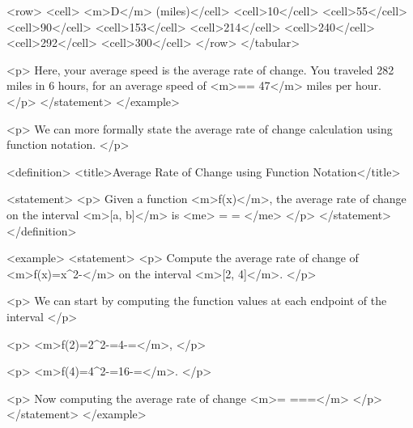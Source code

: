                    <row>
                        <cell> <m>D</m> (miles)</cell>
                        <cell>10</cell>
                        <cell>55</cell>
                        <cell>90</cell>
                        <cell>153</cell>
                        <cell>214</cell>
                        <cell>240</cell>
                        <cell>292</cell>
                        <cell>300</cell>
                    </row>
                </tabular>

                <p>
                    Here, your average speed is the average rate of change.
                    You traveled 282 miles in 6 hours, for an average speed of <m>== 47</m> miles per hour.
                </p>
            </statement>
        </example>

        <p>
            We can more formally state the average rate of change calculation using function notation.
        </p>

        <definition>
            <title>Average Rate of Change using Function Notation</title>

            <statement>
                <p>
                    Given a function <m>f(x)</m>, the average rate of change on the interval <m>[a, b]</m> is
                    <me>
                        = =
                    </me>
                </p>
            </statement>
        </definition>

        <example>
            <statement>
                <p>
                    Compute the average rate of change of <m>f(x)=x^{2}-</m> on the interval <m>[2, 4]</m>.
                </p>

                <p>
                    We can start by computing the function values at each endpoint of the interval
                </p>

                <p>
                    <m>f(2)=2^{2}-=4-=</m>,
                </p>

                <p>
                    <m>f(4)=4^{2}-=16-=</m>.
                </p>

                <p>
                    Now computing the average rate of change <m>= ===</m>
                </p>
            </statement>
        </example>


